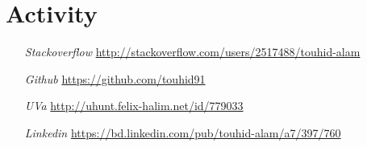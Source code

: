 \section{Activity}

\begin{itemize}
  \item[\textit{Stackoverflow}] \url{http://stackoverflow.com/users/2517488/touhid-alam}
  \item[\textit{Github}] \url{https://github.com/touhid91}
  \item[\textit{UVa}] \url{http://uhunt.felix-halim.net/id/779033}
  \item[\textit{Linkedin}] \url{https://bd.linkedin.com/pub/touhid-alam/a7/397/760}
\end{itemize}
